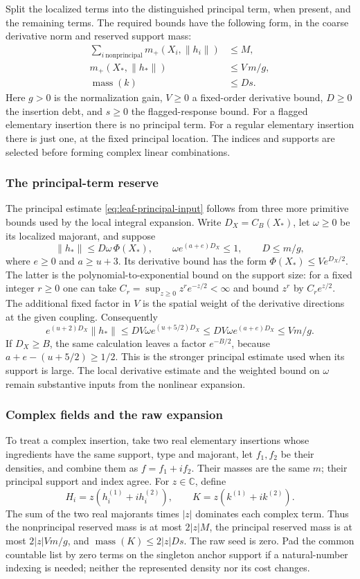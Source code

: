 Split the localized terms into the distinguished principal term, when
present, and the remaining terms. The required bounds have the following
form, in the coarse derivative norm and reserved support mass:
\begin{align}
 \sum_{i\ \mathrm{nonprincipal}}m_+(X_i,\|h_i\|)&\le M,
       \label{eq:leaf-tail-input}\\
 m_+(X_*,\|h_*\|)&\le V\,m/g,
       \label{eq:leaf-principal-input}\\
 \operatorname{mass}(k)&\le D s.
       \label{eq:leaf-flag-input}
\end{align}
Here $g>0$ is the normalization gain, $V\ge0$ a fixed-order derivative
bound, $D\ge0$ the insertion debt, and $s\ge0$ the flagged-response
bound. For a flagged elementary insertion there is no principal term.
For a regular elementary insertion there is just one, at the fixed
principal location. The indices and supports are selected before
forming complex linear combinations.

\subsubsection{The principal-term reserve}
The principal estimate \eqref{eq:leaf-principal-input} follows from
three more primitive bounds used by the local integral expansion.
Write $D_X=C_B(X_*)$, let $\omega\ge0$ be its localized majorant,
and suppose
\[
 \|h_*\|\le D\omega\,\Phi(X_*),\qquad
 \omega e^{(a+e)D_X}\le1,\qquad
 D\le m/g,
\]
where $e\ge0$ and $a\ge u+3$. Its derivative bound has the form
$\Phi(X_*)\le V e^{D_X/2}$. The latter is the polynomial-to-exponential
bound on the support size: for a fixed integer $r\ge0$ one can take
$C_r=\sup_{z\ge0}z^re^{-z/2}<\infty$ and bound $z^r$ by
$C_re^{z/2}$. The additional fixed factor in $V$ is the spatial
weight of the derivative directions at the given coupling.
Consequently
\[
 e^{(u+2)D_X}\|h_*\|
 \le DV\omega e^{(u+5/2)D_X}
 \le DV\omega e^{(a+e)D_X}
 \le Vm/g.
\]
If $D_X\ge B$, the same calculation leaves a factor $e^{-B/2}$,
because $a+e-(u+5/2)\ge1/2$. This is the stronger principal
estimate used when its support is large. The local derivative
estimate and the weighted bound on $\omega$ remain substantive
inputs from the nonlinear expansion.

\subsubsection{Complex fields and the raw expansion}
To treat a complex insertion, take two real elementary insertions
whose ingredients have the same support, type and majorant, let
$f_1,f_2$ be their densities, and combine them as $f=f_1+if_2$. Their masses are the same $m$; their principal support
and index agree. For $z\in\mathbb C$, define
\[
      H_i=z(h_i^{(1)}+ih_i^{(2)}),\qquad
      K=z(k^{(1)}+ik^{(2)}).
\]
The sum of the two real majorants times $|z|$ dominates each
complex term. Thus the nonprincipal reserved mass is at most
$2|z|M$, the principal reserved mass is at most $2|z|Vm/g$, and
$\operatorname{mass}(K)\le2|z|Ds$.
The raw seed is zero. Pad the common countable list by zero terms
on the singleton anchor support if a natural-number indexing is
needed; neither the represented density nor its cost changes.

